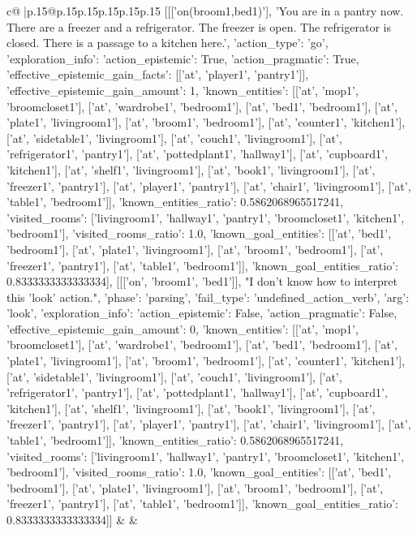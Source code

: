 \documentclass{article}
\begin{document}
{\begin{supertabular}{c@{$\;$}|p{.15\linewidth}@{}p{.15\linewidth}p{.15\linewidth}p{.15\linewidth}p{.15\linewidth}p{.15\linewidth}}
{{{	 [[['on(broom1,bed1)'], 'You are in a pantry now. There are a freezer and a refrigerator. The freezer is open. The refrigerator is closed. There is a passage to a kitchen here.', {'action_type': 'go', 'exploration_info': {'action_epistemic': True, 'action_pragmatic': True, 'effective_epistemic_gain_facts': [['at', 'player1', 'pantry1']], 'effective_epistemic_gain_amount': 1, 'known_entities': [['at', 'mop1', 'broomcloset1'], ['at', 'wardrobe1', 'bedroom1'], ['at', 'bed1', 'bedroom1'], ['at', 'plate1', 'livingroom1'], ['at', 'broom1', 'bedroom1'], ['at', 'counter1', 'kitchen1'], ['at', 'sidetable1', 'livingroom1'], ['at', 'couch1', 'livingroom1'], ['at', 'refrigerator1', 'pantry1'], ['at', 'pottedplant1', 'hallway1'], ['at', 'cupboard1', 'kitchen1'], ['at', 'shelf1', 'livingroom1'], ['at', 'book1', 'livingroom1'], ['at', 'freezer1', 'pantry1'], ['at', 'player1', 'pantry1'], ['at', 'chair1', 'livingroom1'], ['at', 'table1', 'bedroom1']], 'known_entities_ratio': 0.5862068965517241, 'visited_rooms': ['livingroom1', 'hallway1', 'pantry1', 'broomcloset1', 'kitchen1', 'bedroom1'], 'visited_rooms_ratio': 1.0, 'known_goal_entities': [['at', 'bed1', 'bedroom1'], ['at', 'plate1', 'livingroom1'], ['at', 'broom1', 'bedroom1'], ['at', 'freezer1', 'pantry1'], ['at', 'table1', 'bedroom1']], 'known_goal_entities_ratio': 0.8333333333333334}}], [[['on', 'broom1', 'bed1']], "I don't know how to interpret this 'look' action.", {'phase': 'parsing', 'fail_type': 'undefined_action_verb', 'arg': 'look', 'exploration_info': {'action_epistemic': False, 'action_pragmatic': False, 'effective_epistemic_gain_amount': 0, 'known_entities': [['at', 'mop1', 'broomcloset1'], ['at', 'wardrobe1', 'bedroom1'], ['at', 'bed1', 'bedroom1'], ['at', 'plate1', 'livingroom1'], ['at', 'broom1', 'bedroom1'], ['at', 'counter1', 'kitchen1'], ['at', 'sidetable1', 'livingroom1'], ['at', 'couch1', 'livingroom1'], ['at', 'refrigerator1', 'pantry1'], ['at', 'pottedplant1', 'hallway1'], ['at', 'cupboard1', 'kitchen1'], ['at', 'shelf1', 'livingroom1'], ['at', 'book1', 'livingroom1'], ['at', 'freezer1', 'pantry1'], ['at', 'player1', 'pantry1'], ['at', 'chair1', 'livingroom1'], ['at', 'table1', 'bedroom1']], 'known_entities_ratio': 0.5862068965517241, 'visited_rooms': ['livingroom1', 'hallway1', 'pantry1', 'broomcloset1', 'kitchen1', 'bedroom1'], 'visited_rooms_ratio': 1.0, 'known_goal_entities': [['at', 'bed1', 'bedroom1'], ['at', 'plate1', 'livingroom1'], ['at', 'broom1', 'bedroom1'], ['at', 'freezer1', 'pantry1'], ['at', 'table1', 'bedroom1']], 'known_goal_entities_ratio': 0.8333333333333334}}]] 
	  } 
	   } 
	   } 
	 & & \\ 
 


\end{supertabular}}
\end{document}
